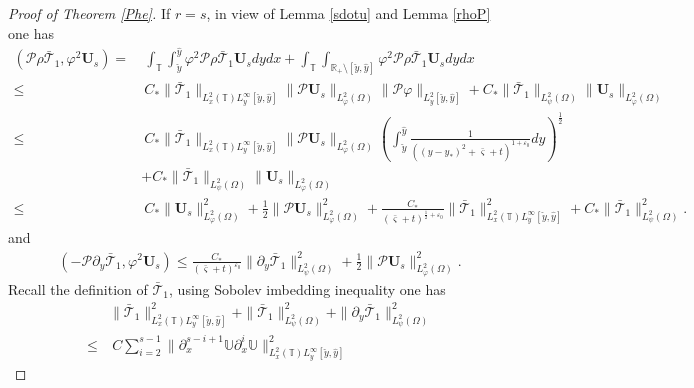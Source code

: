 \documentclass{amsart}
\numberwithin{equation}{section}
\begin{document}
\begin{proof}[Proof of Theorem \ref{Phe}]
If $r=s$, in view of Lemma \ref{sdotu} and Lemma \ref{rhoP} one has
\begin{align}\label{J6s1}
\left(\mathcal{P}\rho\bar{\mathcal{T}}_{1},\varphi^{2}\mathbf{U}_{s}\right)
=&~\int_{\mathbb{T}}\int_{\check{y}}^{\hat{y}}\varphi^{2}\mathcal{P}\rho\bar{\mathcal{T}}_{1}\mathbf{U}_{s}dydx
  +\int_{\mathbb{T}}\int_{\mathbb{R}_{+}\setminus[\check{y},\hat{y}]}\varphi^{2}\mathcal{P}\rho\bar{\mathcal{T}}_{1}\mathbf{U}_{s}dydx\\
\leq&~C_{*}\|\bar{\mathcal{T}}_{1}\|_{L^{2}_{x}(\mathbb{T})L^{\infty}_{y}[\check{y},\hat{y}]}
      \|\mathcal{P}\mathbf{U}_{s}\|_{L_{\varphi}^{2}(\Omega)}\|\mathcal{P}\varphi\|_{L_{y}^{2}[\check{y},\hat{y}]}
     +C_{*}\|\bar{\mathcal{T}}_{1}\|_{L_{\psi}^{2}(\Omega)}\|\mathbf{U}_{s}\|_{L_{\varphi}^{2}(\Omega)}\nonumber\\
\leq&~C_{*}\|\bar{\mathcal{T}}_{1}\|_{L^{2}_{x}(\mathbb{T})L^{\infty}_{y}[\check{y},\hat{y}]}
      \|\mathcal{P}\mathbf{U}_{s}\|_{L_{\varphi}^{2}(\Omega)}
      \left(\int_{\check{y}}^{\hat{y}}\frac{1}{((y-y_{*})^2+\bar{\varsigma}+t)^{1+\varepsilon_{0}}}dy\right)^{\frac{1}{2}}\nonumber\\
    &+C_{*}\|\bar{\mathcal{T}}_{1}\|_{L_{\psi}^{2}(\Omega)}\|\mathbf{U}_{s}\|_{L_{\varphi}^{2}(\Omega)}\nonumber\\
\leq&~C_{*}\|\mathbf{U}_{s}\|_{L_{\varphi}^{2}(\Omega)}^{2}
     +\frac{1}{2}\|\mathcal{P}\mathbf{U}_{s}\|_{L_{\varphi}^{2}(\Omega)}^{2}
     +\frac{C_{*}}{(\bar{\varsigma}+t)^{\frac{1}{2}+\varepsilon_{0}}}\|\bar{\mathcal{T}}_{1}\|_{L_{x}^{2}(\mathbb{T})L_{y}^{\infty}[\check{y},\hat{y}]}^{2}
     +C_{*}\|\bar{\mathcal{T}}_{1}\|_{L_{\psi}^{2}(\Omega)}^{2}.\nonumber
\end{align}
and
\begin{align}\label{J6s2}
\left(-\mathcal{P}\partial_{y}\bar{\mathcal{T}}_{1},\varphi^{2}\mathbf{U}_{s}\right)
\leq \frac{C_{*}}{(\bar{\varsigma}+t)^{\varepsilon_{0}}}\|\partial_{y}\bar{\mathcal{T}}_{1}\|_{L_{\psi}^{2}(\Omega)}^{2}
    +\frac{1}{2}\|\mathcal{P}\mathbf{U}_{s}\|_{L_{\varphi}^{2}(\Omega)}^{2}.
\end{align}
Recall the definition of $\bar{\mathcal{T}}_{1}$, using Sobolev imbedding inequality one has
\begin{align}\label{J6s3}
&\|\bar{\mathcal{T}}_{1}\|_{L_{x}^{2}(\mathbb{T})L_{y}^{\infty}[\check{y},\hat{y}]}^{2}
+\|\bar{\mathcal{T}}_{1}\|_{L_{\psi}^{2}(\Omega)}^{2}
+\|\partial_{y}\bar{\mathcal{T}}_{1}\|_{L_{\psi}^{2}(\Omega)}^{2}\\
\leq&~C\sum_{i=2}^{s-1}\|\partial_{x}^{s-i+1}\mathbb{U}\partial_{x}^{i}\mathbb{U}\|_{L_{x}^{2}(\mathbb{T})L_{y}^{\infty}[\check{y},\hat{y}]}^{2}

\end{align}
\end{proof}
\end{document}
